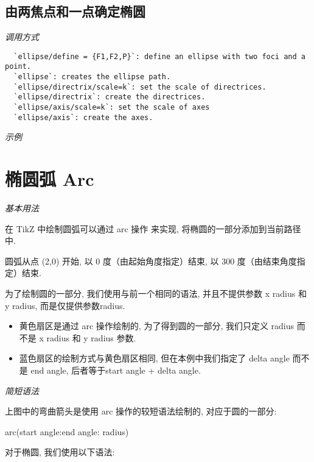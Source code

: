 \subsection{由两焦点和一点确定椭圆}

\emph{调用方式}

\begin{verbatim}
  `ellipse/define = {F1,F2,P}`: define an ellipse with two foci and a point.
  `ellipse`: creates the ellipse path.
  `ellipse/directrix/scale=k`: set the scale of directrices.
  `ellipse/directrix`: create the directrices.
  `ellipse/axis/scale=k`: set the scale of axes
  `ellipse/axis`: create the axes.
\end{verbatim}

\emph{示例}


\section{椭圆弧 Arc}

\emph{基本用法}

在 TikZ 中绘制圆弧可以通过 arc 操作 来实现, 将椭圆的一部分添加到当前路径中.


圆弧从点 (2,0) 开始, 以 0 度（由起始角度指定）结束, 以 300 度（由结束角度指定）结束.

为了绘制圆的一部分, 我们使用与前一个相同的语法, 并且不提供参数 x radius 和 y radius, 而是仅提供参数radius.


\begin{itemize}

\item 黄色扇区是通过 arc 操作绘制的, 为了得到圆的一部分, 我们只定义 radius 而不是  x radius 和 y radius 参数. 

\item 蓝色扇区的绘制方式与黄色扇区相同, 但在本例中我们指定了 delta angle 而不是 end angle, 后者等于start angle + delta angle.

\end{itemize}

\emph{简短语法}

上图中的弯曲箭头是使用 arc 操作的较短语法绘制的, 对应于圆的一部分:

arc(start angle:end angle: radius)

对于椭圆, 我们使用以下语法: 

